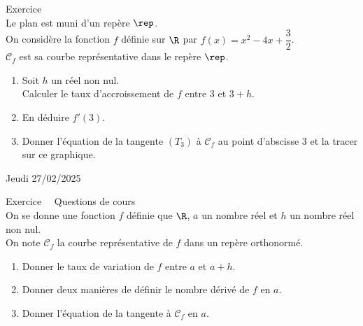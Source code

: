 \documentclass[a4paper,11pt,eval]{nsi}
\newcounter{exoNum}
\newcommand{\exo}[1]
{
	\addtocounter{exoNum}{1}
	{\titlefont\color{UGLiBlue}\Large Exercice\ \theexoNum\ \normalsize{#1}}\smallskip	
}
\begin{document}
\begin{minipage}{10.5cm}
    \exo{}\\
	Le plan est muni d'un repère $\rep$.\\
	On considère la fonction $f$ définie sur $\R$ par $f(x)=x^2-4x+\dfrac{3}{2}$.\\
	
	$\mathcal{C}_f$ est sa courbe représentative dans le repère $\rep$.
	\begin{enumerate}[]
		\item 	Soit $h$ un réel non nul.\\
        Calculer le taux d'accroissement de $f$ entre $3$ et $3+h$.
		\item En déduire $f'(3)$.
		\item 	Donner l'équation de la tangente $(T_3)$ à $\mathcal{C}_f$ au point d'abscisse 3 et la tracer sur ce graphique.\\
	\end{enumerate}
\end{minipage}
\begin{minipage}{6.5cm}
	\begin{center}
	\end{center}
\end{minipage}
\vspace{1cm}

\newpage

\setcounter{exoNum}{0}


\textcolor{UGLiBlue}{Jeudi 27/02/2025}\\
\maketitle
\vspace*{.1cm}

\exo{ Questions de cours}\\
On se donne une fonction $f$ définie que $\R$, $a$ un nombre réel et $h$ un nombre réel non nul.\\
On note $\mathcal{C}_f$ la courbe représentative de $f$ dans un repère orthonormé.
\begin{enumerate}
    \item Donner le taux de variation de $f$ entre $a$ et $a+h$.\\[.5em]
    \item Donner deux manières de définir le nombre dérivé de $f$ en $a$.\\[.5em]
    \item Donner l'équation de la tangente à $\mathcal{C}_f$ en $a$.\\[.5em]
\end{enumerate}
\end{document}
